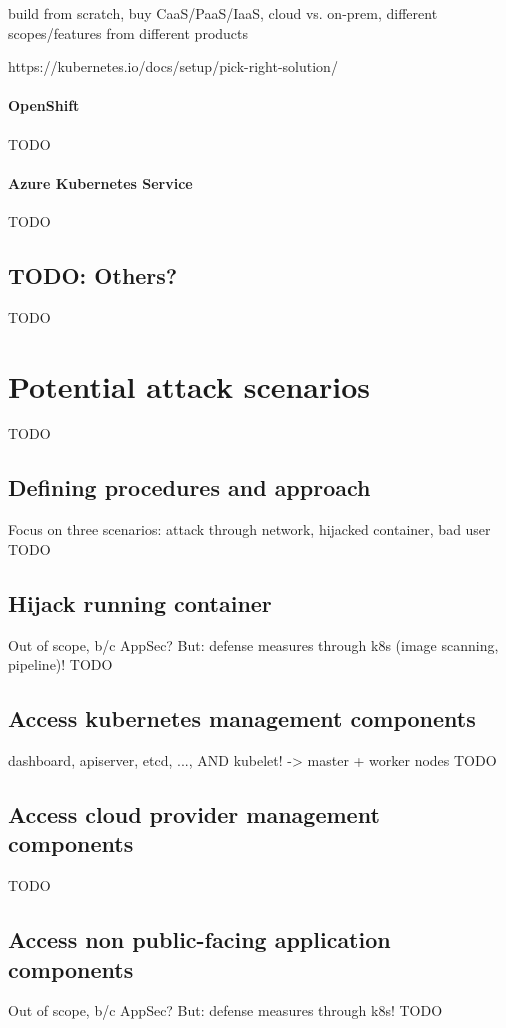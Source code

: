 build from scratch, buy CaaS/PaaS/IaaS, cloud vs. on-prem, different scopes/features from different products

https://kubernetes.io/docs/setup/pick-right-solution/

\subsubsection{OpenShift}
TODO

\subsubsection{Azure Kubernetes Service}
TODO

\section{TODO: Others?}
TODO

\chapter{Potential attack scenarios}
TODO

\section{Defining procedures and approach}
Focus on three scenarios: attack through network, hijacked container, bad user
TODO

\section{Hijack running container}
Out of scope, b/c AppSec? But: defense measures through k8s (image scanning, pipeline)!
TODO

\section{Access kubernetes management components}
dashboard, apiserver, etcd, ..., AND kubelet! -> master + worker nodes
TODO

\section{Access cloud provider management components}
TODO

\section{Access non public-facing application components}
Out of scope, b/c AppSec? But: defense measures through k8s!
TODO

